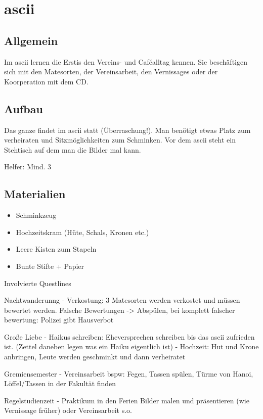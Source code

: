 \section{ascii}

\subsection{Allgemein}

Im ascii lernen die Erstis den Vereins- und Caféalltag kennen. Sie beschäftigen sich mit den Matesorten, der Vereinsarbeit, den Vernissages oder der Koorperation mit dem CD. 

\subsection{Aufbau}

Das ganze findet im ascii statt (Überraschung!). Man benötigt etwas Platz zum verheiraten und Sitzmöglichkeiten zum Schminken. Vor dem ascii steht ein Stehtisch auf dem man die Bilder mal kann.

Helfer: Mind. 3


\subsection{Materialien}
\begin{itemize}
    \item Schminkzeug
\item Hochzeitskram (Hüte, Schals, Kronen etc.)
\item Leere Kisten zum Stapeln
\item Bunte Stifte + Papier

\end{itemize}

Involvierte Questlines

Nachtwanderunng - Verkostung: 3 Matesorten werden verkostet und müssen bewertet werden. Falsche Bewertungen -> Abspülen, bei komplett falscher bewertung: Polizei gibt Hausverbot 


Große Liebe - Haikus schreiben: Eheversprechen schreiben bis das ascii zufrieden ist. (Zettel daneben legen was ein Haiku eigentlich ist)
- Hochzeit: Hut und Krone anbringen, Leute werden geschminkt und dann verheiratet

Gremiensemester - Vereinsarbeit
bspw: Fegen, Tassen spülen, Türme von Hanoi, Löffel/Tassen in der Fakultät finden

Regelstudienzeit - Praktikum in den Ferien
Bilder malen und präsentieren (wie Vernissage früher)
oder Vereinsarbeit s.o.

